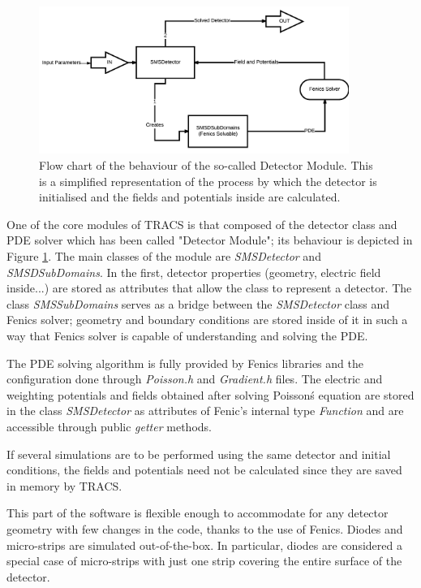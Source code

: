 \begin{figure}[H]
	\includegraphics[width=0.9\textwidth]{Detector_Module.png}
	\caption{Flow chart of the behaviour of the so-called Detector Module. This is a simplified representation of the process by which the detector is initialised and the fields and potentials inside are calculated.}
	\label{fig:DetectorFc}
\end{figure}

One of the core modules of TRACS is that composed of the detector class and PDE solver which has been called "Detector Module"; its behaviour is depicted in Figure \ref{fig:DetectorFc}. The main classes of the module are \textit{SMSDetector} and \textit{SMSDSubDomains}. In the first, detector properties (geometry, electric field inside...) are stored as attributes that allow the class to represent a detector. The class \textit{SMSSubDomains} serves as a bridge between the \textit{SMSDetector} class and Fenics solver; geometry and boundary conditions are stored inside of it in such a way that Fenics solver is capable of understanding and solving the PDE. 

The PDE solving algorithm is fully provided by Fenics libraries and the configuration done through \textit{Poisson.h} and \textit{Gradient.h} files. The electric and weighting potentials and fields obtained after solving Poissonś equation are stored in the class \textit{SMSDetector} as attributes of Fenic's internal type \textit{Function} and are accessible through public \textit{getter} methods.

If several simulations are to be performed using the same detector and initial conditions, the fields and potentials need not be calculated since they are saved in memory by TRACS. 

This part of the software is flexible enough to accommodate for any detector geometry with few changes in the code, thanks to the use of Fenics. Diodes and micro-strips are simulated out-of-the-box. In particular, diodes are considered a special case of micro-strips with just one strip covering the entire surface of the detector.

